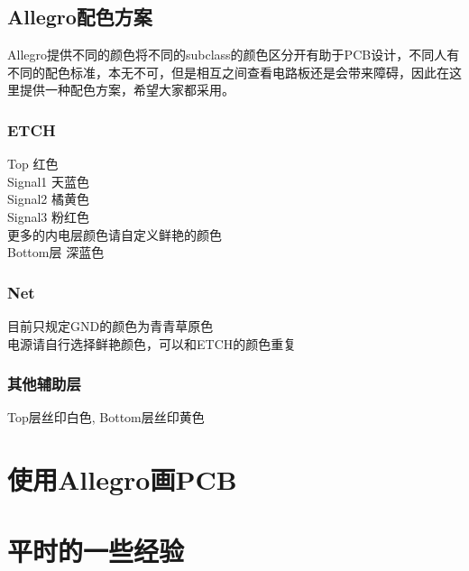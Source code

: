 \documentclass[color=green,mathpazo,titlestyle=hang,11pt]{elegantbook}
\begin{document}
\section{Allegro配色方案}
Allegro提供不同的颜色将不同的subclass的颜色区分开有助于PCB设计，不同人有不同的配色标准，本无不可，但是相互之间查看电路板还是会带来障碍，因此在这里提供一种配色方案，希望大家都采用。\\
\subsection{ETCH}
\begin{center}
\textcolor[rgb]{1,0,0}{Top 红色}\\
\textcolor[rgb]{0.13,0.8,0.94}{Signal1 天蓝色}\\
\textcolor[rgb]{1,0.5,0}{Signal2 橘黄色}\\
\textcolor[rgb]{1,0,1}{Signal3 粉红色}\\
更多的内电层颜色请自定义鲜艳的颜色\\
\textcolor[rgb]{0,0,1}{Bottom层 深蓝色}\\
\end{center}
\subsection{Net}
目前只规定\textcolor[rgb]{0,1,0}{GND}的颜色为\textcolor[rgb]{0,1,0}{青青草原色}\\
电源请自行选择鲜艳颜色，可以和ETCH的颜色重复
\subsection{其他辅助层}
\colorbox[rgb]{0.5,0.5,0.5}{\textcolor[rgb]{1,1,1}{Top层丝印白色}}, \colorbox[rgb]{0.5,0.5,0.5}{\textcolor[rgb]{1,1,0}{Bottom层丝印黄色}}
\chapter{使用Allegro画PCB}
\chapter{平时的一些经验}
\end{document}
